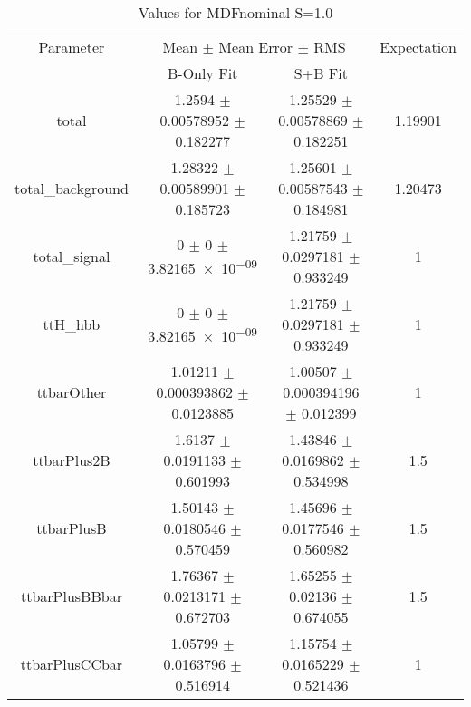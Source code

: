 \begin{table}
\centering
\caption{Values for MDFnominal S=1.0}
\begin{tabular}{cccc}
\toprule
Parameter & \multicolumn{2}{c}{Mean $\pm$ Mean Error $\pm$ RMS} & Expectation\\
 & B-Only Fit & S+B Fit & \\
\midrule
total & \num{1.2594} $\pm$ \num{0.00578952} $\pm$ \num{0.182277} & \num{1.25529} $\pm$ \num{0.00578869} $\pm$ \num{0.182251} & \num{1.19901}\\
total\_background & \num{1.28322} $\pm$ \num{0.00589901} $\pm$ \num{0.185723} & \num{1.25601} $\pm$ \num{0.00587543} $\pm$ \num{0.184981} & \num{1.20473}\\
total\_signal & \num{0} $\pm$ \num{0} $\pm$ \num{3.82165e-09} & \num{1.21759} $\pm$ \num{0.0297181} $\pm$ \num{0.933249} & \num{1}\\
ttH\_hbb & \num{0} $\pm$ \num{0} $\pm$ \num{3.82165e-09} & \num{1.21759} $\pm$ \num{0.0297181} $\pm$ \num{0.933249} & \num{1}\\
ttbarOther & \num{1.01211} $\pm$ \num{0.000393862} $\pm$ \num{0.0123885} & \num{1.00507} $\pm$ \num{0.000394196} $\pm$ \num{0.012399} & \num{1}\\
ttbarPlus2B & \num{1.6137} $\pm$ \num{0.0191133} $\pm$ \num{0.601993} & \num{1.43846} $\pm$ \num{0.0169862} $\pm$ \num{0.534998} & \num{1.5}\\
ttbarPlusB & \num{1.50143} $\pm$ \num{0.0180546} $\pm$ \num{0.570459} & \num{1.45696} $\pm$ \num{0.0177546} $\pm$ \num{0.560982} & \num{1.5}\\
ttbarPlusBBbar & \num{1.76367} $\pm$ \num{0.0213171} $\pm$ \num{0.672703} & \num{1.65255} $\pm$ \num{0.02136} $\pm$ \num{0.674055} & \num{1.5}\\
ttbarPlusCCbar & \num{1.05799} $\pm$ \num{0.0163796} $\pm$ \num{0.516914} & \num{1.15754} $\pm$ \num{0.0165229} $\pm$ \num{0.521436} & \num{1}\\
\bottomrule
\end{tabular}
\end{table}